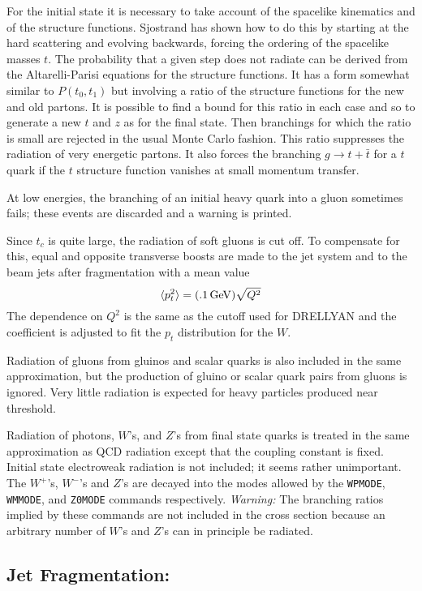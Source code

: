       For the initial state it is necessary to take account of the
spacelike kinematics and of the structure functions. Sjostrand has
shown how to do this by starting at the hard scattering and evolving
backwards, forcing the ordering of the spacelike masses $t$. The
probability that a given step does not radiate can be derived from the
Altarelli-Parisi equations for the structure functions. It has a form
somewhat similar to $P(t_0,t_1)$ but involving a ratio of the structure
functions for the new and old partons. It is possible to find a bound
for this ratio in each case and so to generate a new $t$ and $z$ as for
the final state. Then branchings for which the ratio is small are
rejected in the usual Monte Carlo fashion. This ratio suppresses the
radiation of very energetic partons. It also forces the branching $g
\to t + \bar t$ for a $t$ quark if the $t$ structure function vanishes
at small momentum transfer.

      At low energies, the branching of an initial heavy quark into a
gluon sometimes fails; these events are discarded and a warning is
printed.

      Since $t_c$ is quite large, the radiation of soft gluons is cut
off. To compensate for this, equal and opposite transverse boosts are
made to the jet system and to the beam jets after fragmentation with a
mean value
$$
\langle p_t^2\rangle = (.1\,{\rm GeV}) \sqrt{Q^2}
$$
The dependence on $Q^2$ is the same as the cutoff used for DRELLYAN and
the coefficient is adjusted to fit the $p_t$ distribution for the $W$.

      Radiation of gluons from gluinos and scalar quarks is also
included in the same approximation, but the production of gluino or
scalar quark pairs from gluons is ignored. Very little radiation is
expected for heavy particles produced near threshold.

      Radiation of photons, $W$'s, and $Z$'s from final state quarks is
treated in the same approximation as QCD radiation except that the
coupling constant is fixed. Initial state electroweak radiation is not
included; it seems rather unimportant. The $W^+$'s, $W^-$'s and $Z$'s
are decayed into the modes allowed by the \verb|WPMODE|, \verb|WMMODE|,
and \verb|Z0MODE| commands respectively. {\it Warning:} The branching
ratios implied by these commands are not included in the cross section
because an arbitrary number of $W$'s and $Z$'s can in principle be
radiated.

\subsection{Jet Fragmentation:}

